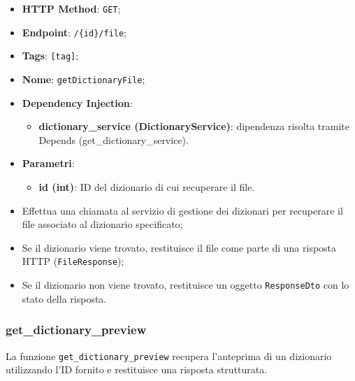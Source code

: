 \begin{itemize}
  \item \textbf{HTTP Method}: \texttt{GET};
  \item \textbf{Endpoint}: \texttt{/\{id\}/file};
  \item \textbf{Tags}: \texttt{[tag]};
  \item \textbf{Nome}: \texttt{getDictionaryFile};
  \item \textbf{Dependency Injection}:
  \begin{itemize}
    \item \textbf{dictionary\_service (DictionaryService)}: dipendenza risolta tramite Depends (get\_dictionary\_service).
  \end{itemize}
    \item \textbf{Parametri}:
  \begin{itemize}
    \item \textbf{id (int)}: ID del dizionario di cui recuperare il file.
  \end{itemize}
\end{itemize}

\begin{itemize}
  \item Effettua una chiamata al servizio di gestione dei dizionari per recuperare il file associato al dizionario specificato;
  \item Se il dizionario viene trovato, restituisce il file come parte di una risposta HTTP (\texttt{FileResponse});
  \item Se il dizionario non viene trovato, restituisce un oggetto \texttt{ResponseDto} con lo stato della risposta.
\end{itemize}

\subsubsection{get\_dictionary\_preview}

\par La funzione \texttt{get\_dictionary\_preview} recupera l'anteprima di un dizionario utilizzando l'ID fornito e restituisce una risposta strutturata.

